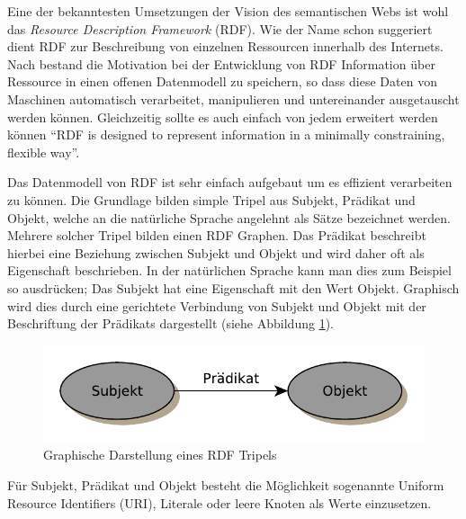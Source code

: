 
Eine der bekanntesten Umsetzungen der Vision des  semantischen Webs ist wohl das \emph{Resource Description Framework} (RDF). Wie der Name schon suggeriert dient RDF zur Beschreibung von einzelnen Ressourcen innerhalb des Internets. Nach \cite{Klyne2004,Manola2004} bestand die Motivation bei der Entwicklung von RDF Information über Ressource in einen offenen Datenmodell zu speichern, so dass diese Daten von Maschinen automatisch verarbeitet, manipulieren und untereinander ausgetauscht werden können. Gleichzeitig sollte es auch einfach von jedem erweitert werden können \enquote{RDF is designed to represent information in a minimally constraining, flexible way}\cite{Klyne2004}.

\medskip

Das Datenmodell von RDF ist sehr einfach aufgebaut um es effizient verarbeiten zu können. Die Grundlage bilden simple Tripel aus Subjekt, Prädikat und Objekt, welche an die natürliche Sprache angelehnt als Sätze\cite{Heinzen} bezeichnet werden. Mehrere solcher Tripel bilden einen RDF Graphen. Das Prädikat beschreibt hierbei eine Beziehung zwischen Subjekt und Objekt und wird daher oft als Eigenschaft beschrieben. In der natürlichen Sprache kann man dies zum Beispiel so ausdrücken; Das Subjekt hat eine Eigenschaft mit den Wert Objekt. Graphisch wird dies durch eine gerichtete Verbindung von Subjekt und Objekt mit der Beschriftung der Prädikats dargestellt (siehe Abbildung \ref{fig:graphische_darstellung_eines_rdf_tripels}).

\medskip

\begin{figure}[h]
    \centering
    \includegraphics[scale=0.7]{assets/images/rdf-triple}
    \caption{Graphische Darstellung eines RDF Tripels}
    \label{fig:graphische_darstellung_eines_rdf_tripels}
\end{figure} 

Für Subjekt, Prädikat und Objekt besteht die Möglichkeit sogenannte Uniform Resource Identifiers (URI), Literale oder leere Knoten als Werte einzusetzen. 

